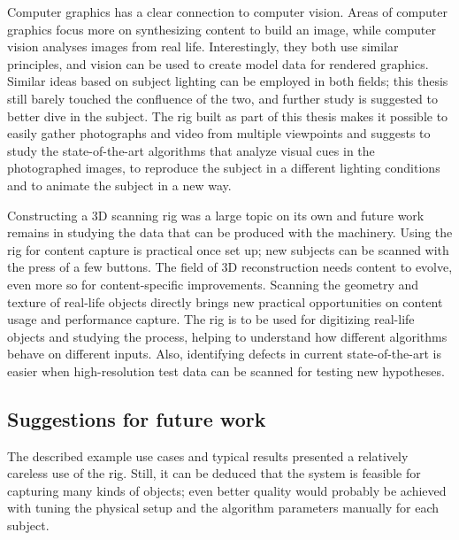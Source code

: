 Computer graphics has a clear connection to computer vision.
Areas of computer graphics focus more on synthesizing content to build an image, while computer vision analyses images from real life.
Interestingly, they both use similar principles, and vision can be used to create model data for rendered graphics.
Similar ideas based on subject lighting can be employed in both fields; this thesis still barely touched the confluence of the two, and further study is suggested to better dive in the subject.
The rig built as part of this thesis makes it possible to easily gather photographs and video from multiple viewpoints and suggests to study the state-of-the-art algorithms that analyze visual cues in the photographed images, to reproduce the subject in a different lighting conditions and to animate the subject in a new way.

Constructing a 3D scanning rig was a large topic on its own and future work remains in studying the data that can be produced with the machinery.
Using the rig for content capture is practical once set up; new subjects can be scanned with the press of a few buttons.
The field of 3D reconstruction needs content to evolve, even more so for content-specific improvements.
Scanning the geometry and texture of real-life objects directly brings new practical opportunities on content usage and performance capture.
The rig is to be used for digitizing real-life objects and studying the process, helping to understand how different algorithms behave on different inputs.
Also, identifying defects in current state-of-the-art is easier when high-resolution test data can be scanned for testing new hypotheses.


\subsection{Suggestions for future work}

The described example use cases and typical results presented a relatively careless use of the rig.
Still, it can be deduced that the system is feasible for capturing many kinds of objects; even better quality would probably be achieved with tuning the physical setup and the algorithm parameters manually for each subject.

